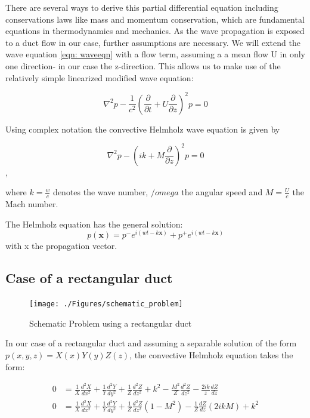 \documentclass[11pt]{report} %
\begin{document}
There are several ways to derive this partial differential equation including conservations laws like mass and momentum conservation, which are fundamental equations in thermodynamics and mechanics.
As the wave propagation is exposed to a duct flow in our case, further assumptions are necessary.
We will extend the wave equation \eqref{eqn: waveeqn} with a flow term, assuming a a mean flow U in only one direction- in our case the z-direction. 
This allows us to make use of the relatively simple linearized modified wave equation: 

\begin{equation}
    \nabla ^2p-\frac{1}{c^2} \left( \frac{\partial}{\partial t}+U\frac{\partial}{\partial z} \right)^2p  = 0
\end{equation}   

Using complex notation the convective Helmholz wave equation is given by 

\begin{equation}
\nabla^2 p - \left(ik +M\frac{\partial}{\partial z}\right)^2p = 0
\end{equation},  

where $k=\frac{w}{c}$ denotes the wave number, $/omega$ the angular speed and $M=\frac{U}{c}$ the Mach number. 

The Helmholz equation has the general solution:
\begin{equation}
p(\textbf{x})=p^{-}e^{i(wt-k\textbf{x})}+p^{+}e^{i(wt-k\textbf{x})}
\end{equation}
with x the propagation vector. 

\subsection{Case of a rectangular duct}

\begin{figure}[H]
\centering
\texttt{[image: ./Figures/schematic\_problem]}
\caption{Schematic Problem using a rectangular duct}
\end{figure}

In our case of a rectangular duct and assuming a separable solution of the form  $p(x,y,z) = X(x)Y(y)Z(z)$, the convective Helmholz equation takes the form: 

\begin{subequations}
\begin{align}
0&=\frac{1}{X} \frac{d^2X}{dx^2}+\frac{1}{Y} \frac{d^2Y}{dy^2}+\frac{1}{Z} \frac{d^2Z}{dz^2} +k^2 -\frac{M^2}{Z}\frac{d^2Z}{dz^2}-\frac{2ik}{z} \frac{dZ}{dz}\\
0&=\frac{1}{X} \frac{d^2X}{dx^2}+\frac{1}{Y} \frac{d^2Y}{dy^2}+\frac{1}{Z} \frac{d^2Z}{dz^2}(1-M^2) -\frac{1}{Z}\frac{dZ}{dz}(2ikM)+k^2 	
\end{align}
\end{subequations}
\end{document}
